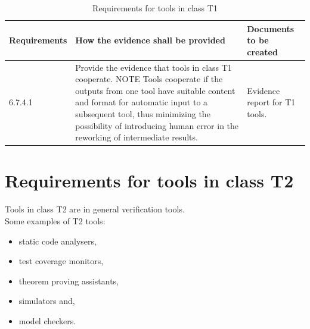 \documentclass{template/openetcs_report}
\begin{document}
{\footnotesize\sffamily\centering
\begin{longtable}{|p{2cm}|p{9cm}|p{3cm}|}
\caption{Requirements for tools in class T1}\\
\hline
\bfseries Requirements & \bfseries How the evidence shall be provided & \bfseries Documents to be created\\
\hline
\hline
\endhead
\hline
\endfoot

6.7.4.1 & Provide the evidence that tools in class T1 cooperate.
\linebreak
\linebreak
NOTE \linebreak
Tools cooperate if the outputs from one tool have suitable content and format for automatic input to a subsequent tool, thus minimizing the possibility of introducing human error in the reworking of intermediate results. & Evidence report for T1 tools.\\ 
\hline

\end{longtable}}



\section{Requirements for tools in class T2}
\label{T2}
Tools in class T2 are in general verification tools.\\
Some examples of T2 tools:
\begin{itemize}\itemsep=0pt
  \item static code analysers,
  \item test coverage monitors,
  \item theorem proving assistants,
  \item simulators and,
  \item model checkers.
\end{itemize}
\end{document}
